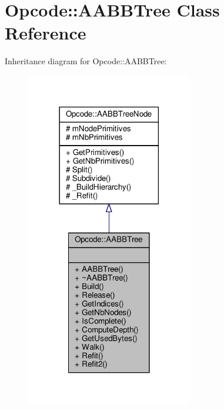\hypertarget{classOpcode_1_1AABBTree}{}\section{Opcode\+:\+:A\+A\+B\+B\+Tree Class Reference}
\label{classOpcode_1_1AABBTree}


Inheritance diagram for Opcode\+:\+:A\+A\+B\+B\+Tree\+:
\nopagebreak
\begin{figure}[H]
\begin{center}
\leavevmode
\includegraphics[width=206pt]{df/d98/classOpcode_1_1AABBTree__inherit__graph}
\end{center}
\end{figure}


